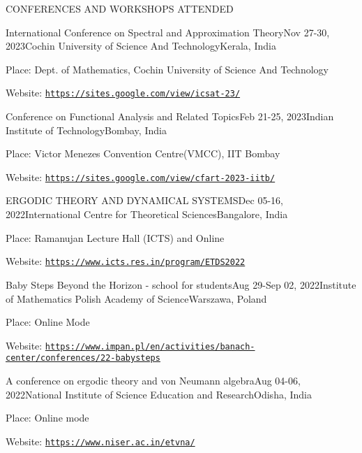 \documentclass{resume} %
\newcommand{\weblink}[1]{\texttt{\href{#1}{#1}}}
\begin{document}
\begin{rSection}{CONFERENCES AND WORKSHOPS ATTENDED}
	
	\begin{rSubsection}{International Conference on Spectral and Approximation Theory}{Nov 27-30, 2023}{Cochin University of Science And Technology}{Kerala, India}
		\item Place: Dept. of Mathematics, Cochin University of Science And Technology 
		\item Website: \weblink{https://sites.google.com/view/icsat-23/}
	\end{rSubsection}

    \begin{rSubsection}{Conference on Functional Analysis and Related Topics}{Feb 21-25, 2023}{Indian Institute of Technology}{Bombay, India}
		\item Place: Victor Menezes Convention Centre(VMCC), IIT Bombay
		\item Website: \weblink{https://sites.google.com/view/cfart-2023-iitb/}
	\end{rSubsection}
	
	\begin{rSubsection}{ERGODIC THEORY AND DYNAMICAL SYSTEMS}{Dec 05-16, 2022}{International Centre for Theoretical Sciences}{Bangalore, India}
		\item Place: Ramanujan Lecture Hall (ICTS) and Online
		\item Website: \weblink{https://www.icts.res.in/program/ETDS2022}
	\end{rSubsection}
	
	\begin{rSubsection}{Baby Steps Beyond the Horizon - school for students}{Aug 29-Sep 02, 2022}{Institute of Mathematics Polish Academy of Science}{Warszawa, Poland}
		\item Place: Online Mode
		\item Website: \weblink{https://www.impan.pl/en/activities/banach-center/conferences/22-babysteps}
	\end{rSubsection}
	
	\begin{rSubsection}{A conference on ergodic theory and von Neumann algebra}{Aug 04-06, 2022}{National Institute of Science Education and Research}{Odisha, India}
		\item Place: Online mode
		\item Website: \weblink{https://www.niser.ac.in/etvna/}
	\end{rSubsection}


\end{rSection}
\end{document}
